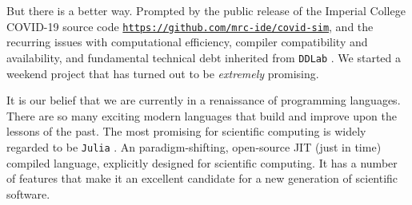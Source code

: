 But there is a better way. Prompted by the public release of the Imperial College COVID-19 source code \href{https://github.com/mrc-ide/covid-sim}{\texttt{https://github.com/mrc-ide/covid-sim}}, and the recurring issues with computational efficiency, compiler compatibility and availability, and fundamental technical debt inherited from \texttt{DDLab} \cite{ddlab}. We started a weekend project that has turned out to be \emph{extremely} promising.

It is our belief that we are currently in a renaissance of programming languages. There are so many exciting modern languages that build and improve upon the lessons of the past. The most promising for scientific computing is widely regarded to be \texttt{Julia} \cite{julia}. An paradigm-shifting, open-source JIT (just in time) compiled language, explicitly designed for scientific computing. It has a number of features that make it an excellent candidate for a new generation of scientific software.
